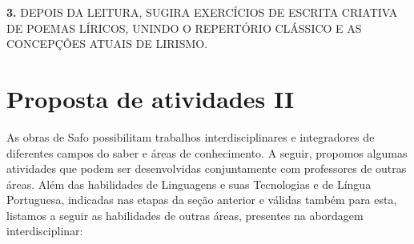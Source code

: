 \documentclass[12pt]{extarticle}
\begin{document}





\textbf{3.} DEPOIS DA LEITURA, SUGIRA EXERCÍCIOS DE ESCRITA CRIATIVA DE
POEMAS LÍRICOS, UNINDO O REPERTÓRIO CLÁSSICO E AS CONCEPÇÕES ATUAIS DE
LIRISMO.

\section{Proposta de atividades II}


As obras de Safo possibilitam trabalhos interdisciplinares e
integradores de diferentes campos do saber e áreas de conhecimento. A
seguir, propomos algumas atividades que podem ser desenvolvidas
conjuntamente com professores de outras áreas. Além das habilidades de
Linguagens e suas Tecnologias e de Língua Portuguesa, indicadas nas
etapas da seção anterior e válidas também para esta, listamos a seguir
as habilidades de outras áreas, presentes na abordagem interdisciplinar:
\end{document}
